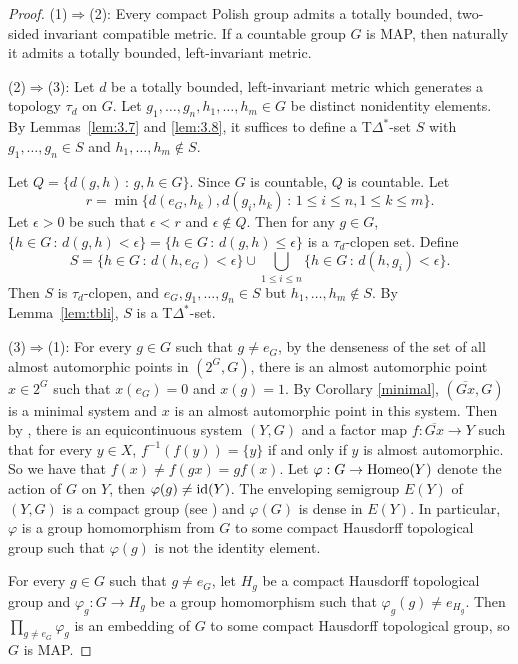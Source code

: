 \documentclass[11pt]{amsart}
\theoremstyle{definition}
\numberwithin{equation}{section}
\theoremstyle{definition}
\begin{document}
\begin{proof} (1)$\Rightarrow$(2): Every compact Polish group admits a totally bounded, two-sided invariant compatible metric. If a countable group $G$ is MAP, then naturally it admits a totally bounded, left-invariant metric.

(2)$\Rightarrow$(3): Let $d$ be a totally bounded, left-invariant metric which generates a topology $\tau_d$ on $G$. Let $g_1,\dots, g_n, h_1,\dots, h_m\in G$ be distinct nonidentity elements. By Lemmas~\ref{lem:3.7} and \ref{lem:3.8}, it suffices to define a T$\Delta^*$-set $S$ with $g_1,\dots, g_n\in S$ and $h_1,\dots, h_m\not\in S$.

Let $Q=\{d(g,h)\,:\, g,h\in G\}$. Since $G$ is countable, $Q$ is countable. Let
$$r=\min\{d(e_G, h_k), d(g_i, h_k)\,:\, 1\leq i\leq n, 1\leq k\leq m\}.$$
Let $\epsilon>0$ be such that $\epsilon< r$ and $\epsilon\not\in Q$. Then for any $g\in G$, $\{h\in G\,:\, d(g,h)<\epsilon\}=\{h\in G\,:\, d(g, h)\leq \epsilon\}$ is a $\tau_d$-clopen set. Define
$$ S=\{h\in G\,:\, d(h, e_G)<\epsilon\}\cup\bigcup_{1\leq i\leq n} \{h\in G\,:\, d(h, g_i)<\epsilon\}. $$
Then $S$ is $\tau_d$-clopen, and $e_G, g_1, \dots, g_n\in S$ but $h_1,\dots, h_m\not\in S$. By Lemma~\ref{lem:tbli}, $S$ is a T$\Delta^*$-set.

(3)$\Rightarrow$(1): For every $g\in G$ such that $g\ne e_G$, by the denseness of the set of all almost automorphic points in $(2^G, G)$, there is an almost automorphic point $x\in 2^G$ such that $x(e_G)=0$ and $x(g)=1$. By Corollary \ref{minimal}, $(\overline{G x},G)$ is a minimal system and $x$ is an almost automorphic point in this system. Then by  \cite[Section 3.4]{Veech1}, there is an equicontinuous system $(Y,G)$ and  a factor map $f:\overline{G x}\to Y$ such that for every $y\in X$, $f^{-1}(f(y))=\{y\}$ if and only if $y$ is almost automorphic. So we have that $f(x)\ne f(gx)=gf(x)$. Let $\varphi:G\to{\rm Homeo}(Y)$ denote the action of $G$ on $Y$, then $\varphi(g)\ne {\rm id}(Y)$. The enveloping semigroup $E(Y)$ of $(Y,G)$ is a compact group (see \cite[Chapter 3, Theorem 3]{AusBook}) and $\varphi(G)$ is dense in $E(Y)$. In particular, $\varphi$ is a group homomorphism from $G$ to some compact Hausdorff topological group such that $\varphi(g)$ is not the identity element.

For every $g\in G$ such that $g\ne e_G$, let $H_g$ be a compact Hausdorff topological group and $\varphi_g:G\to H_g$ be a group homomorphism such that $\varphi_g(g)\ne e_{H_g}$. Then $\prod_{g\ne e_G}\varphi_g$ is an embedding of $G$ to some compact Hausdorff topological group, so $G$ is MAP.
\end{proof}
\end{document}
